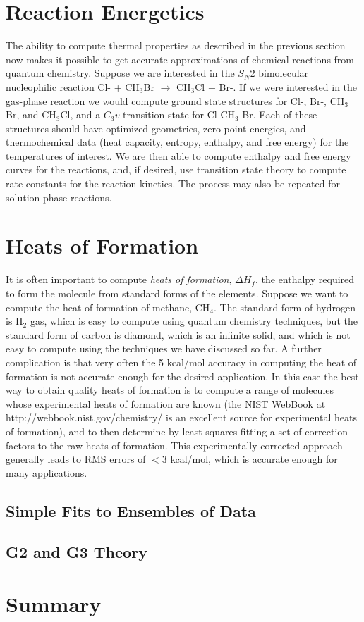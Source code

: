 \section{Reaction Energetics}

The ability to compute thermal properties as described in the previous
section now makes it possible to get accurate approximations of
chemical reactions from quantum chemistry. Suppose we are interested
in the $S_N2$ bimolecular nucleophilic reaction Cl- + CH$_3$Br
$\rightarrow$ CH$_3$Cl + Br-. If we were interested in the gas-phase
reaction we would compute ground state structures for Cl-, Br-,
CH$_3$Br, and CH$_3$Cl, and a $C_3v$ transition state for
Cl-CH$_3$-Br. Each of these structures should have optimized
geometries, zero-point energies, and thermochemical data (heat
capacity, entropy, enthalpy, and free energy) for the temperatures of
interest. We are then able to compute enthalpy and free energy curves
for the reactions, and, if desired, use transition state theory to
compute rate constants for the reaction kinetics. The process may also
be repeated for solution phase reactions.

\section{Heats of Formation}
It is often important to compute \emph{heats of formation}, $\Delta
H_f$, the enthalpy required to form the molecule from standard forms
of the elements. Suppose we want to compute the heat of formation of
methane, CH$_4$. The standard form of hydrogen is H$_2$ gas, which is
easy to compute using quantum chemistry techniques, but the standard
form of carbon is diamond, which is an infinite solid, and which is
not easy to compute using the techniques we have discussed so far. A
further complication is that very often the 5 kcal/mol accuracy in
computing the heat of formation is not accurate enough for the desired
application. In this case the best way to obtain quality heats of
formation is to compute a range of molecules whose experimental heats
of formation are known (the NIST WebBook at
http://webbook.nist.gov/chemistry/ is an excellent source for
experimental heats of formation), and to then determine by
least-squares fitting a set of correction factors to the raw heats of
formation. This experimentally corrected approach generally leads to
RMS errors of $< 3$ kcal/mol, which is accurate enough for many
applications. 

\subsection{Simple Fits to Ensembles of Data}

\subsection{G2 and G3 Theory}

\section{Summary}

